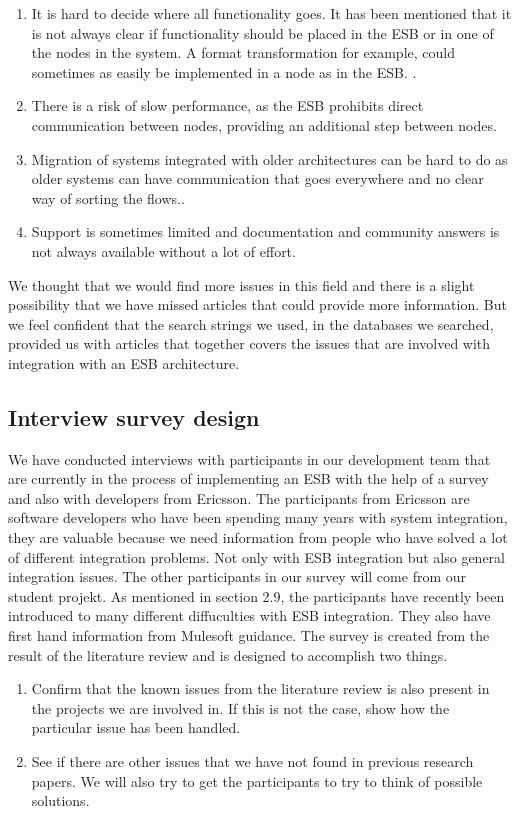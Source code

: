 \documentclass{llncs}
\begin{document}
\begin{enumerate}
\item It is hard to decide where all functionality goes. It has been mentioned that it is not always clear if functionality should be placed in the ESB or in one of the nodes in the system. A format transformation for example, could sometimes as easily be implemented in a node as in the ESB.  \cite{ortiz07}.
\item There is a risk of slow performance, as the ESB prohibits direct communication between nodes, providing an additional step between nodes.
\item Migration of systems integrated with older architectures can be hard to do as older systems can have communication that goes everywhere and no clear way of sorting the flows.\cite{ortiz07}.
\item Support is sometimes limited and documentation and community answers is not always available without a lot of effort.
\end{enumerate}

We thought that we would find more issues in this field and there is a slight possibility that we have missed articles that could provide more information. But we feel confident that the search strings we used, in the databases we searched, provided us with articles that together covers the issues that are involved with integration with an ESB architecture.

\subsection{Interview survey design}

We have conducted interviews with participants in our development team that are currently in the process of implementing an ESB with the help of a survey and also with developers from Ericsson. The participants from Ericsson are software developers who have been spending many years with system integration, they are valuable because we need information from people who have solved a lot of different integration problems. Not only with ESB integration but also general integration issues. The other participants in our survey will come from our student projekt. As mentioned in section 2.9, the participants have recently been introduced to many different diffuculties with ESB integration. They also have first hand information from Mulesoft guidance.
The survey is created from the result of the literature review and is designed to accomplish two things.
\begin{enumerate}
\item Confirm that the known issues from the literature review is also present in the projects we are involved in. If this is not the case, show how the particular issue has been handled.
\item See if there are other issues that we have not found in previous research papers. We will also try to get the participants to try to think of possible solutions.
\end{enumerate}
\end{document}
